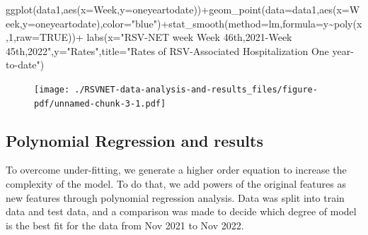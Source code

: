 \documentclass[
  letterpaper,
  DIV=11,
  numbers=noendperiod]{scrreport}
\newenvironment{Shaded}{\begin{snugshade}}{\end{snugshade}}
\newcommand{\AttributeTok}[1]{\textcolor[rgb]{0.40,0.45,0.13}{#1}}
\newcommand{\ConstantTok}[1]{\textcolor[rgb]{0.56,0.35,0.01}{#1}}
\newcommand{\DecValTok}[1]{\textcolor[rgb]{0.68,0.00,0.00}{#1}}
\newcommand{\FunctionTok}[1]{\textcolor[rgb]{0.28,0.35,0.67}{#1}}
\newcommand{\NormalTok}[1]{\textcolor[rgb]{0.00,0.23,0.31}{#1}}
\newcommand{\SpecialCharTok}[1]{\textcolor[rgb]{0.37,0.37,0.37}{#1}}
\newcommand{\StringTok}[1]{\textcolor[rgb]{0.13,0.47,0.30}{#1}}
\begin{document}
\begin{Shaded}
\begin{Highlighting}[]
\FunctionTok{ggplot}\NormalTok{(data1,}\FunctionTok{aes}\NormalTok{(}\AttributeTok{x=}\NormalTok{Week,}\AttributeTok{y=}\NormalTok{oneyeartodate))}\SpecialCharTok{+}\FunctionTok{geom\_point}\NormalTok{(}\AttributeTok{data=}\NormalTok{data1,}\FunctionTok{aes}\NormalTok{(}\AttributeTok{x=}\NormalTok{Week,}\AttributeTok{y=}\NormalTok{oneyeartodate),}\AttributeTok{color=}\StringTok{"blue"}\NormalTok{)}\SpecialCharTok{+}\FunctionTok{stat\_smooth}\NormalTok{(}\AttributeTok{method=}\NormalTok{lm,}\AttributeTok{formula=}\NormalTok{y}\SpecialCharTok{\textasciitilde{}}\FunctionTok{poly}\NormalTok{(x,}\DecValTok{1}\NormalTok{,}\AttributeTok{raw=}\ConstantTok{TRUE}\NormalTok{))}\SpecialCharTok{+}
  \FunctionTok{labs}\NormalTok{(}\AttributeTok{x=}\StringTok{"RSV{-}NET week Week 46th,2021{-}Week 45th,2022"}\NormalTok{,}\AttributeTok{y=}\StringTok{"Rates"}\NormalTok{,}\AttributeTok{title=}\StringTok{"Rates of RSV{-}Associated Hospitalization One year{-}to{-}date"}\NormalTok{)}
\end{Highlighting}
\end{Shaded}

\begin{figure}[H]

{\centering \texttt{[image: ./RSVNET-data-analysis-and-results\_files/figure-pdf/unnamed-chunk-3-1.pdf]}

}

\end{figure}

\hypertarget{polynomial-regression-and-results}{%
\subsection{Polynomial Regression and
results}\label{polynomial-regression-and-results}}

To overcome under-fitting, we generate a higher order equation to
increase the complexity of the model. To do that, we add powers of the
original features as new features through polynomial regression
analysis. Data was split into train data and test data, and a comparison
was made to decide which degree of model is the best fit for the data
from Nov 2021 to Nov 2022.
\end{document}
